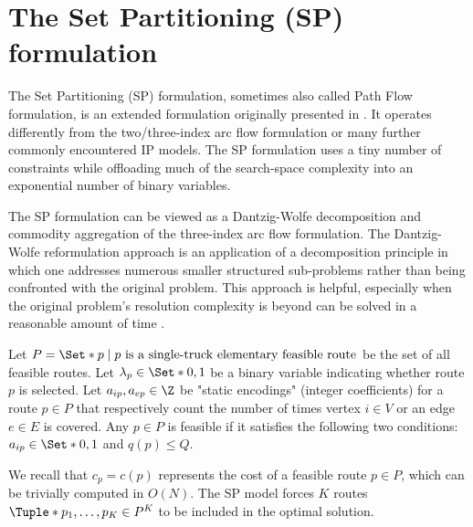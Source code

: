 \section{The Set Partitioning (SP) formulation}
\label{sec:set-partitionining-formulation}

The Set Partitioning (SP) formulation,
sometimes also called Path Flow formulation,
is an extended formulation originally presented in \textcite{balinski1964}.
It operates differently from the two/three-index arc flow formulation or many further commonly encountered IP models.
The SP formulation uses a tiny number of constraints
while offloading much of the search-space complexity into an exponential number of binary variables.

The SP formulation can be viewed as a Dantzig-Wolfe decomposition \parencite{dantzig1960}
and commodity aggregation \parencite{desaulniers1998}
of the three-index arc flow formulation.
The Dantzig-Wolfe reformulation approach is an application of a
decomposition principle in which one addresses numerous smaller structured sub-problems
rather than being confronted with the original problem.
This approach is helpful, especially when the
original problem's resolution complexity
is beyond can be solved in a reasonable amount of time \parencite{vanderbeck2005}.

Let $P = \Set*{p \mid p\ \text{is a single-truck elementary feasible route}}$ be the set of all feasible routes.
Let $\lambda_p \in \Set*{0, 1}$ be a binary variable indicating whether route $p$ is selected.
Let $a_{ip}, a_{ep} \in \Z$ be "static encodings" (integer coefficients)
for a route $p \in P$ that respectively count
the number of times vertex $i \in V$ or an edge $e \in E$ is covered.
Any $p \in P$ is feasible if it satisfies the following two conditions:
$a_{ip} \in \Set*{0, 1}$ and $q(p) \le Q$.

We recall that $c_p = c(p)$ represents the cost of a feasible route $p \in P$,
which can be trivially computed in $O(N)$.
The SP model forces $K$ routes $\Tuple*{p_1, \dots, p_K} \in P^K$ to be included in the optimal solution.

